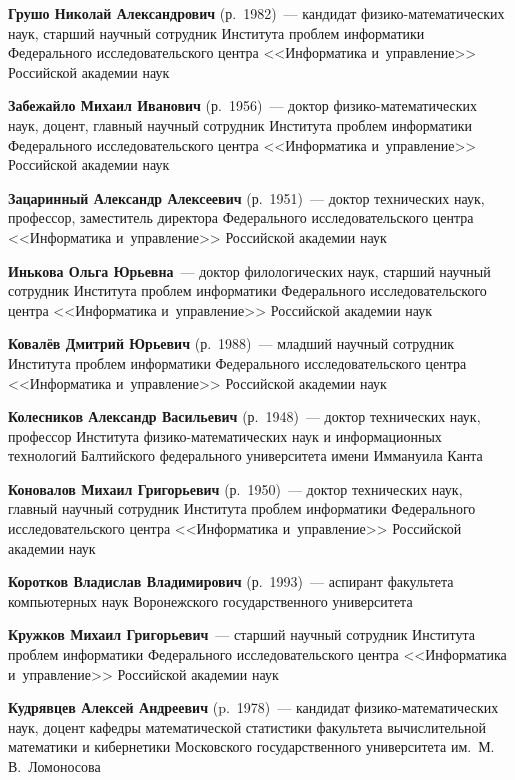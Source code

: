\begin{multicols}{2}
\noindent
\textbf{Грушо Николай Александрович} (р.\ 1982)~--- кандидат фи\-зи\-ко-ма\-те\-ма\-ти\-че\-ских
 наук, старший научный сотрудник Института проб\-лем информатики 
 Федерального исследовательского центра <<Информатика и~управ\-ле\-ние>> 
 Российской академии наук

\noindent
\textbf{Забежайло Михаил Иванович} (р.\ 1956)~--- 
доктор фи\-зи\-ко-ма\-те\-ма\-ти\-че\-ских наук, доцент, главный научный 
сотрудник Института проб\-лем информатики Федерального исследовательского центра 
<<Информатика и~управ\-ле\-ние>> Российской академии наук

\noindent
\textbf{Зацаринный Александр Алексеевич} (р.\ 1951)~--- 
доктор технических наук, профессор, заместитель директора Федерального 
исследовательского центра <<Информатика и~управ\-ле\-ние>>
 Российской академии наук
 
 \noindent
\textbf{Инькова Ольга Юрьевна}~---
доктор филологических наук, старший научный сотрудник Института проб\-лем 
информатики Федерального исследовательского центра <<Информатика и~управ\-ле\-ние>>
Российской академии наук

\noindent
\textbf{Ковалёв Дмитрий Юрьевич} (р.\ 1988)~--- 
младший научный сотрудник Института проб\-лем информатики Федерального 
исследовательского центра <<Информатика и~управ\-ле\-ние>> Российской академии наук

\noindent
\textbf{Колесников Александр Васильевич} (р.\ 1948)~--- 
доктор технических наук, профессор Института фи\-зи\-ко-ма\-те\-ма\-ти\-че\-ских 
наук и информационных технологий Балтийского федерального университета имени 
Иммануила Канта

\noindent
\textbf{Коновалов Михаил Григорьевич} (р.\ 1950)~---
доктор технических наук, главный научный сотрудник Института проб\-лем 
информатики Федерального исследовательского центра <<Информатика и~управ\-ле\-ние>>
Российской академии наук 
 
\noindent
\textbf{Коротков Владислав Владимирович} (р.\ 1993)~--- 
аспирант факультета компьютерных наук Воронежского государственного университета 



\noindent
\textbf{Кружков Михаил Григорьевич}~--- 
старший научный сотрудник Института проб\-лем информатики Федерального 
исследовательского центра <<Информатика и~управ\-ле\-ние>> Российской академии наук

 \noindent
\textbf{Кудрявцев Алексей Андреевич} (p.\ 1978)~--- 
кандидат фи\-зи\-ко-ма\-те\-ма\-ти\-че\-ских наук, доцент кафедры математической 
статистики факультета вычислительной математики и кибернетики Московского 
государственного университета им.\ М.\,В.~Ломоносова


\end{multicols}
